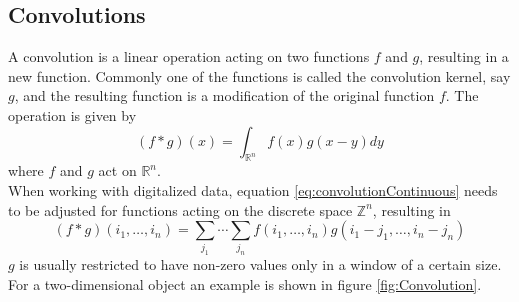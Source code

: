 


\subsection{Convolutions}
A convolution is a linear operation acting on two functions $f$ and $g$, resulting in a new function. Commonly one of the functions is called the convolution kernel, say $g$, and the resulting function is a modification of the original function $f$. The operation is given by
\begin{equation} \label{eq:convolutionContinuous}
(f*g)(x) = \int_{\mathbb{R}^n} f(x)g(x-y)dy
\end{equation}
where $f$ and $g$ act on $\mathbb{R}^n$.  \\

When working with digitalized data, equation \ref{eq:convolutionContinuous} needs to be adjusted for functions acting on the discrete space $\mathbb{Z}^n$, resulting in
\begin{equation}\label{eq:convolutionDiscrete}
(f*g)(i_1,\dots ,i_n) = \sum_{j_1} \cdots \sum_{j_n} f(i_1,\dots ,i_n) g(i_1-j_1,\dots ,i_n-j_n)
\end{equation}
$g$ is usually restricted to have non-zero values only in a window of a certain size. For a two-dimensional object an example is shown in figure \ref{fig:Convolution}. \\

